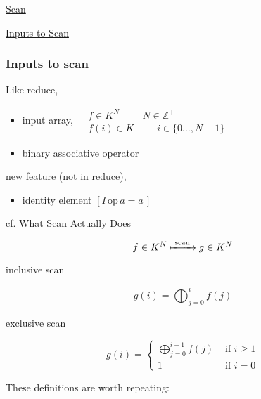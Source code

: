 \documentclass[10pt]{amsart}
\begin{document}
\begin{multicols*}{2}
\href{https://classroom.udacity.com/courses/cs344/lessons/86719951/concepts/873907110923#}{Scan}

\href{https://classroom.udacity.com/courses/cs344/lessons/86719951/concepts/877097890923#}{Inputs to Scan}

\subsubsection*{Inputs to scan}

Like reduce,
\begin{itemize}
  \item input array, $\begin{aligned} & f \in K^N \, \qquad \, N \in \mathbb{Z}^+ \\ & f(i) \in K \, \qquad \, i \in \lbrace 0 \dots , N-1 \rbrace \end{aligned}$
  \item binary associative operator
  \end{itemize}
new feature (not in reduce),
\begin{itemize}
  \item identity element $[I \, \text{op} \, a = a \, ]$  
  \end{itemize}


cf. \href{https://classroom.udacity.com/courses/cs344/lessons/86719951/concepts/878394960923}{What Scan Actually Does}

\[
f\in K^N \xmapsto{ \text{ scan } } g \in K^N
\]

inclusive scan

\[
g(i) = \bigoplus_{j=0}^i f(j)
\]

exclusive scan

\[
g(i) = \begin{cases} \bigoplus_{j=0}^{i-1}f(j) & \text{ if } i \geq 1 \\
  1 & \text{ if } i = 0 \end{cases}
\]

These definitions are worth repeating:


\end{multicols*}
\end{document}
